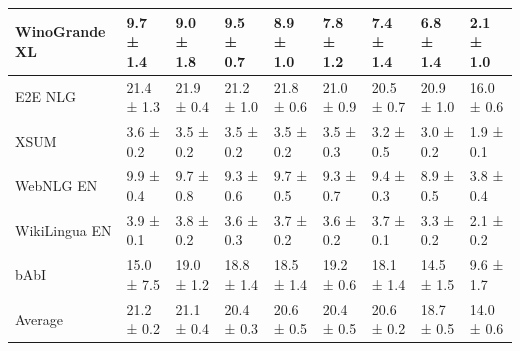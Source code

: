 \documentclass{article}
\begin{document}
\begin{table}
{\begin{tabular}{l|llllllll}
WinoGrande XL & 9.7 ± 1.4 & 9.0 ± 1.8 & 9.5 ± 0.7 & 8.9 ± 1.0 & 7.8 ± 1.2 & 7.4 ± 1.4 & 6.8 ± 1.4 & 2.1 ± 1.0 \\
\midrule
E2E NLG & 21.4 ± 1.3 & 21.9 ± 0.4 & 21.2 ± 1.0 & 21.8 ± 0.6 & 21.0 ± 0.9 & 20.5 ± 0.7 & 20.9 ± 1.0 & 16.0 ± 0.6 \\
XSUM & 3.6 ± 0.2 & 3.5 ± 0.2 & 3.5 ± 0.2 & 3.5 ± 0.2 & 3.5 ± 0.3 & 3.2 ± 0.5 & 3.0 ± 0.2 & 1.9 ± 0.1 \\
WebNLG EN & 9.9 ± 0.4 & 9.7 ± 0.8 & 9.3 ± 0.6 & 9.7 ± 0.5 & 9.3 ± 0.7 & 9.4 ± 0.3 & 8.9 ± 0.5 & 3.8 ± 0.4 \\
WikiLingua EN & 3.9 ± 0.1 & 3.8 ± 0.2 & 3.6 ± 0.3 & 3.7 ± 0.2 & 3.6 ± 0.2 & 3.7 ± 0.1 & 3.3 ± 0.2 & 2.1 ± 0.2 \\
\midrule
bAbI & 15.0 ± 7.5 & 19.0 ± 1.2 & 18.8 ± 1.4 & 18.5 ± 1.4 & 19.2 ± 0.6 & 18.1 ± 1.4 & 14.5 ± 1.5 & 9.6 ± 1.7 \\
\midrule
Average & 21.2 ± 0.2 & 21.1 ± 0.4 & 20.4 ± 0.3 & 20.6 ± 0.5 & 20.4 ± 0.5 & 20.6 ± 0.2 & 18.7 ± 0.5 & 14.0 ± 0.6 \\
\bottomrule
  \end{tabular}
  }
  \label{tab:4b2oscarrep}
\end{table}
\end{document}
